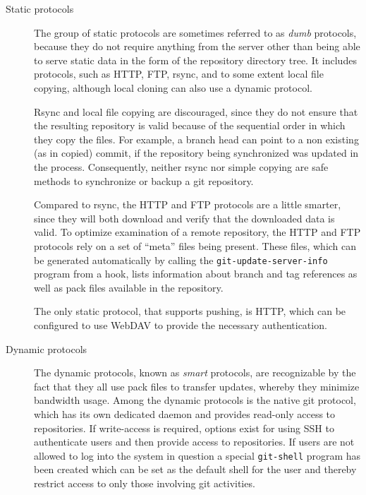 \begin{description}

\item[Static protocols]
%
	The group of static protocols are sometimes referred to as
	\emph{dumb} protocols, because they do not require anything
	from the server other than being able to serve static data
	in the form of the repository directory tree. It includes
	protocols, such as HTTP, FTP, rsync, and to some extent local
	file copying, although local cloning can also use a dynamic
	protocol.

	Rsync and local file copying are discouraged, since they do
	not ensure that the resulting repository is valid because of
	the sequential order in which they copy the files. For
	example, a branch head can point to a non existing (as in
	copied) commit, if the repository being synchronized was
	updated in the process.  Consequently, neither rsync nor
	simple copying are safe methods to synchronize or backup a git
	repository.

	Compared to rsync, the HTTP and FTP protocols are a little
	smarter, since they will both download and verify that the
	downloaded data is valid. To optimize examination of a remote
	repository, the HTTP and FTP protocols rely on a set of
	``meta'' files being present. These files, which can be
	generated automatically by calling the
	\texttt{git-update-server-info} program from a hook, lists
	information about branch and tag references as well as pack
	files available in the repository.

	The only static protocol, that supports pushing, is HTTP,
	which can be configured to use WebDAV to provide the necessary
	authentication.

\item[Dynamic protocols]
%
	The dynamic protocols, known as \emph{smart} protocols,
	are recognizable by the fact that they all use pack files to
	transfer updates, whereby they minimize bandwidth usage. Among
	the dynamic protocols is the native git protocol, which has
	its own dedicated daemon and provides read-only access to
	repositories. If write-access is required, options exist for
	using SSH to authenticate users and then provide access to
	repositories. If users are not allowed to log into the system
	in question a special \texttt{git-shell} program has been
	created which can be set as the default shell for the user and
	thereby restrict access to only those involving git
	activities.

\end{description}


